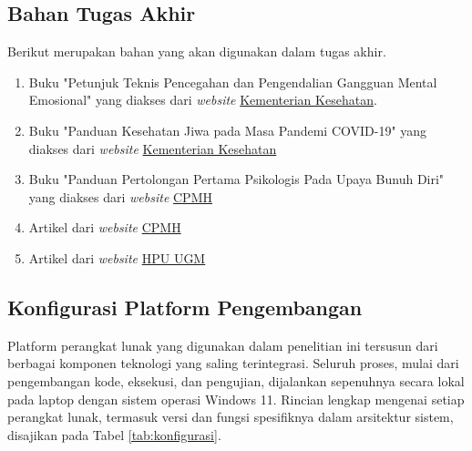 \subsection{Bahan Tugas Akhir}
Berikut merupakan bahan yang akan digunakan dalam tugas akhir.
\begin{enumerate}
	\item Buku "Petunjuk Teknis Pencegahan dan Pengendalian Gangguan Mental Emosional" yang diakses dari \textit{website} \href{https://repository.kemkes.go.id/book/1258}{Kementerian Kesehatan}.
	\item Buku "Panduan Kesehatan Jiwa pada Masa Pandemi COVID-19" yang diakses dari \textit{website} \href{https://pusatkrisis.kemkes.go.id/panduan-kesehatan-jiwa-pada-masa-pandemi-covid-19}{Kementerian Kesehatan}
	\item Buku "Panduan Pertolongan Pertama Psikologis Pada Upaya Bunuh Diri" yang diakses dari \textit{website} \href{https://cpmh.psikologi.ugm.ac.id/wp-content/uploads/sites/39/2021/11/Panduan-Pertolongan-Pertama-Pencegahan-Bunuh-Diri_v1.pdf}{CPMH}
	\item Artikel dari \textit{website} \href{https://cpmh.psikologi.ugm.ac.id/}{CPMH}
	\item Artikel dari \textit{website} \href{https://hpu.ugm.ac.id}{HPU UGM}
\end{enumerate}

\subsection{Konfigurasi Platform Pengembangan}
Platform perangkat lunak yang digunakan dalam penelitian ini tersusun dari berbagai komponen teknologi yang saling terintegrasi.
Seluruh proses, mulai dari pengembangan kode, eksekusi, dan pengujian, dijalankan sepenuhnya secara lokal pada laptop dengan sistem operasi Windows 11.
Rincian lengkap mengenai setiap perangkat lunak, termasuk versi dan fungsi spesifiknya dalam arsitektur sistem, disajikan pada Tabel \ref{tab:konfigurasi}.

